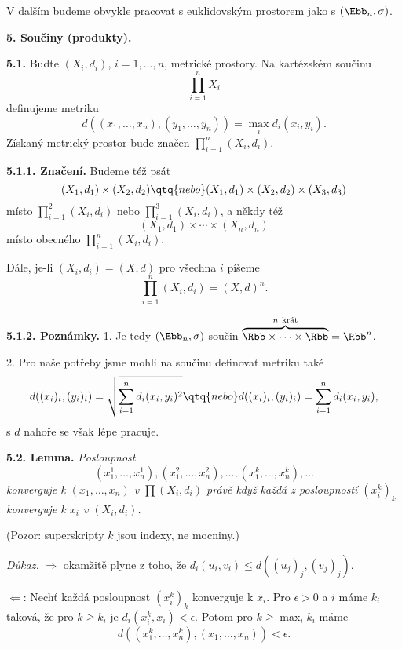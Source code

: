 \documentclass[12pt]{article}
\begin{document}
{ \medskip
 
 V dalším budeme obvykle pracovat s euklidovským prostorem jako s $(\Ebb_n,\sigma)$.
 
 \vskip10mm
 
 {\large\bf 5. Součiny (produkty).}
  
 \bigskip
 
 
 {\bf 5.1.} Budte $(X_i,d_i)$, $i=1,\dots,n$, metrické prostory. Na kartézském součinu
 $$
 \prod_{i=1}^nX_i
 $$
 definujeme metriku
 $$
 d((x_1,\dots,x_n),(y_1,\dots,y_n))=\max_id_i(x_i,y_i).
 $$
Získaný metrický prostor bude značen $\prod_{i=1}^n (X_i,d_i)$.
 
 \medskip
 
 {\bf 5.1.1. Značení.} Budeme též psát
  $$
 (X_1,d_1)\times (X_2,d_2) \qtq{nebo} (X_1,d_1)\times (X_2,d_2)\times (X_3,d_3)
 $$
  místo $\prod_{i=1}^2 (X_i,d_i)$ nebo $\prod_{i=1}^3 (X_i,d_i)$, a někdy též
 $$
 (X_1,d_1)\times \cdots\times  (X_n,d_n)
 $$
 místo obecného
 $\prod_{i=1}^n (X_i,d_i)$.
 
 Dále, je-li $(X_i,d_i)=(X,d)$ pro všechna $i$ píšeme
 $$
  \prod_{i=1}^n (X_i,d_i)=(X,d)^n.
  $$
 
 \medskip
 
 {\bf 5.1.2. Poznámky.} 1. Je tedy $(\Ebb_n,\sigma)$ součin $\overbrace{\Rbb\times\cdots\times\Rbb}^{n\ \text{krát}}=\Rbb^n$.
 
 \smallskip
 
 2. Pro naše potřeby jsme mohli na součinu definovat metriku také
 $$
 d((x_i)_i,(y_i)_i)=\sqrt{\sum_{i=1}^nd_i(x_i,y_i)^2}\qtq{nebo}d((x_i)_i,(y_i)_i)=\sum_{i=1}^nd_i(x_i,y_i),
 $$
 s  $d$ nahoře se však lépe pracuje.
 
 \bigskip
 
 {\bf 5.2. Lemma.} {\em Posloupnost
 $$
 (x_1^1,\dots,x_n^1),(x_1^2,\dots,x_n^2),\dots,(x_1^k,\dots,x_n^k),\dots
 $$
konverguje k $(x_1,\dots,x_n)$ v $\prod (X_i,d_i)$ právě když každá z posloupností $(x_i^k)_k$ konverguje k $x_i$ v $(X_i,d_i)$.}
 
 (Pozor: superskripty $k$ jsou indexy, ne mocniny.)
 
 {\em Důkaz.} $\Rightarrow$ okamžitě plyne z toho, že $d_i(u_i,v_i)\leq d((u_j)_j,(v_j)_j)$.
 
 \smallskip
 
 $\Leftarrow$: Nechť každá posloupnost $(x_i^k)_k$ konverguje k $x_i$. Pro $\epsilon>0$ a $i$ máme 
 $k_i$ taková, že pro $k\geq k_i$ je $d_i(x_i^k,x_i)<\epsilon$. Potom pro $k\geq\max_ik_i$ máme
 $$
 d((x_1^k,\dots,x_n^k),(x_1,\dots,x_n))<\epsilon.
 $$\sq
 
}
\end{document}
